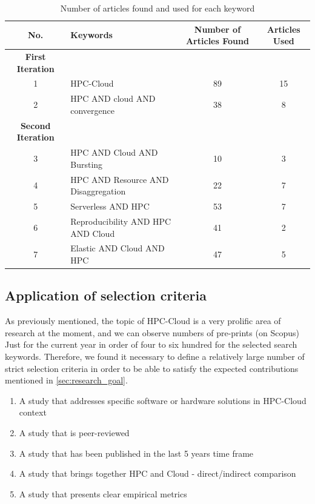 \begin{table}[ht!]
\centering
\small
\begin{tabular}{c|l|c|c}
\hline
\rowcolor{gray!20} \textbf{No.} & \textbf{Keywords} & \textbf{Number of Articles Found} & \textbf{Articles Used} \\ \hline
\hline
\textbf{First Iteration} \\ \hline
\rowcolor{white} 1 & HPC-Cloud & 89 & 15 \\ \hline
\rowcolor{gray!20} 2 & HPC AND cloud AND convergence & 38 & 8 \\ \hline
\hline
\textbf{Second Iteration} \\ \hline
\rowcolor{white} 3 & HPC AND Cloud AND Bursting & 10 & 3 \\ \hline
\rowcolor{gray!20} 4 & HPC AND Resource AND Disaggregation & 22 & 7 \\ \hline
\rowcolor{white} 5 & Serverless AND HPC & 53 & 7 \\ \hline
\rowcolor{gray!20} 6 & Reproducibility AND HPC AND Cloud & 41 & 2 \\ \hline
\rowcolor{white} 7 & Elastic AND Cloud AND HPC & 47 & 5 \\ \hline
\end{tabular}
\caption{Number of articles found and used for each keyword}
\label{tab:keywords}
\end{table}





\subsection{Application of selection criteria}
\label{sec:sel_criteria}


    As previously mentioned, the topic of HPC-Cloud is a very prolific area of research at the moment, and we can observe numbers of pre-prints (on Scopus) Just for the current year in order of four to six hundred for the selected search keywords. Therefore, we found it necessary to define a relatively large number of strict selection criteria in order to be able to satisfy the expected contributions mentioned in \autoref{sec:research_goal}.

    \begin{enumerate}
        \item[{I}1-] A study that addresses specific software or hardware solutions in HPC-Cloud context
        \item[{I}2-] A study that is peer-reviewed
        \item[{I}3-] A study that has been published in the last 5 years time frame
        \item[{I}4-] A study that brings together HPC and Cloud - direct/indirect comparison
        \item[{I}5-] A study that presents clear empirical metrics
    \end{enumerate}

